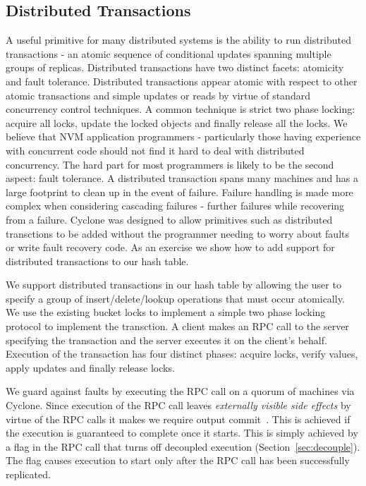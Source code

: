\documentclass[letterpaper,twocolumn,10pt]{article}
\begin{document}
\subsection{Distributed Transactions}
A useful primitive for many distributed systems is the ability to run
distributed transactions - an atomic sequence of conditional updates spanning
multiple groups of replicas. Distributed transactions have two distinct facets:
atomicity and fault tolerance. Distributed transactions appear atomic with
respect to other atomic transactions and simple updates or reads by virtue of
standard concurrency control techniques. A common technique is strict two phase
locking: acquire all locks, update the locked objects and finally release all
the locks. We believe that NVM application programmers - particularly those
having experience with concurrent code should not find it hard to deal with
distributed concurrency. The hard part for most programmers is likely to be the
second aspect: fault tolerance. A distributed transaction spans many machines
and has a large footprint to clean up in the event of failure. Failure handling
is made more complex when considering cascading failures - further failures
while recovering from a failure. Cyclone was designed to allow primitives such
as distributed transctions to be added without the programmer needing to worry
about faults or write fault recovery code. As an exercise we show how to add
support for distributed transactions to our hash table.

We support distributed transactions in our hash table by allowing the user to
specify a group of insert/delete/lookup operations that must occur
atomically. We use the existing bucket locks to implement a simple two phase
locking protocol to implement the transction. A client makes an RPC call to the
server specifying the transaction and the server executes it on the client's
behalf. Execution of the transaction has four distinct phases: acquire locks,
verify values, apply updates and finally release locks.

We guard against faults by executing the RPC call on a quorum of machines via
Cyclone. Since execution of the RPC call leaves \emph{externally visible side
  effects} by virtue of the RPC calls it makes we require output
commit~\cite{output_commit}. This is achieved if the execution is guaranteed to
complete once it starts. This is simply achieved by a flag in the RPC call that
turns off decoupled execution (Section~\ref{sec:decouple}). The flag causes
execution to start only after the RPC call has been successfully replicated.
\end{document}
